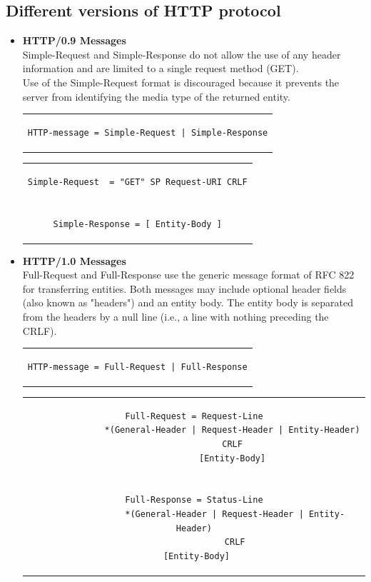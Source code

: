 \subsection{Different versions of HTTP protocol}
\begin{itemize}
\item{\textbf{HTTP/0.9 Messages}\\
Simple-Request and Simple-Response do not allow the use of any header information and are limited to a single request method (GET).\\ Use of the Simple-Request format is discouraged because it prevents the server from identifying the media type of the returned entity.
\begin{center}
\begin{tabular}{c}
\begin{lstlisting}[linewidth=240pt, basicstyle=\footnotesize\sffamily,]
HTTP-message = Simple-Request | Simple-Response
\end{lstlisting}
\end{tabular}
\end{center}
\begin{center}
\begin{tabular}{c}
\begin{lstlisting}[linewidth=230pt, basicstyle=\footnotesize\sffamily,]
Simple-Request  = "GET" SP Request-URI CRLF


Simple-Response = [ Entity-Body ]
\end{lstlisting}
\end{tabular}
\end{center}
}
\item{\textbf{HTTP/1.0 Messages}\\
Full-Request and Full-Response use the generic message format of RFC 822 for transferring entities. Both messages may include optional header fields (also known as "headers") and an entity body. The entity body is separated from the headers by a null line (i.e., a line with nothing preceding the CRLF).
\begin{center}
\begin{tabular}{c}
\begin{lstlisting}[linewidth=230pt, basicstyle=\footnotesize\sffamily,]
HTTP-message = Full-Request | Full-Response
\end{lstlisting}
\end{tabular}
\end{center}
\begin{center}
\begin{tabular}{c}
\begin{lstlisting}[linewidth=340pt, basicstyle=\footnotesize\sffamily,]
Full-Request = Request-Line
               *(General-Header | Request-Header | Entity-Header)
               CRLF
               [Entity-Body]
               
               
Full-Response = Status-Line
                *(General-Header | Request-Header | Entity-Header)
                CRLF
                [Entity-Body]               
\end{lstlisting}
\end{tabular}
\end{center}
}
\end{itemize}

